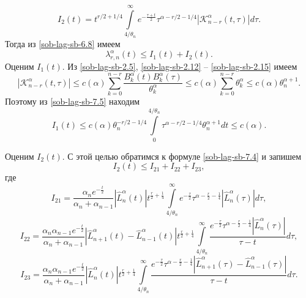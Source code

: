 \begin{equation}
  I_2(t) = t^{r/2+1/4}\int\limits_{4/\theta_n}^{\infty}
  e^{-\frac{\tau+t}{2}}\tau^{\alpha - r/2 - 1/4} \left| \mathcal{K}_{n-r}^\alpha(t, \tau) \right| d\tau.
\label{sob-lag-sb-7.6}
\end{equation}
Тогда из \eqref{sob-lag-sb-6.8} имеем
\begin{equation}
  \lambda_{r,n}^\alpha(t) \leq I_1(t) + I_2(t).
  \label{sob-lag-sb-7.7}
\end{equation}
Оценим $I_1(t)$. Из \eqref{sob-lag-sb-2.5}, \eqref{sob-lag-sb-2.12} -- \eqref{sob-lag-sb-2.15} имеем
\begin{equation*}
  |\mathcal{K}_{n-r}^\alpha(t,\tau)| \leq c(\alpha)\sum\limits_{k=0}^{n-r}\frac{B_k^\alpha(t) B_k^\alpha(\tau)}{\theta_k^\alpha} \leq c(\alpha)\sum\limits_{k=0}^{n-r}\theta_k^\alpha \leq c(\alpha)\theta_n^{\alpha+1}.
\end{equation*}
Поэтому из \eqref{sob-lag-sb-7.5} находим
\begin{equation}\label{sob-lag-sb-7.8}
I_1(t) \leq c(\alpha)\theta_n^{-r/2-1/4}\int\limits_{0}^{4/\theta_n} \tau^{\alpha-r/2-1/4}\theta_n^{\alpha+1}dt \leq  c(\alpha).
\end{equation}

  Оценим $I_2(t)$. С этой целью обратимся к формуле \eqref{sob-lag-sb-7.4} и запишем
\begin{equation}
  I_2(t) \le I_{21}+I_{22}+I_{23},
  \label{sob-lag-sb-7.9}
\end{equation}
где
\begin{equation*}
  I_{21} = \frac{\alpha_n e^{-\frac{t}{2}}}{\alpha_n + \alpha_{n-1}} |\hat{L}_n^\alpha(t)|t^{\frac{r}{2}+\frac{1}{4}}
  \int\limits_{4/\theta_n}^{\infty} e^{-\frac{\tau}{2}}\tau^{\alpha - \frac{r}{2} -\frac{1}{4}} |\hat{L}_n^\alpha(\tau)|d\tau,
\end{equation*}
\begin{equation*}
  I_{22} = \frac{\alpha_n\alpha_{n-1} e^{-\frac{t}{2}}}{\alpha_n+\alpha_{n-1}}|\hat{L}_{n+1}^\alpha(t) - \hat{L}_{n-1}^\alpha(t)|t^{\frac{r}{2}+\frac{1}{4}}
  \int\limits_{4/\theta_n}^{\infty} \frac{e^{-\frac{\tau}{2}}\tau^{\alpha - \frac{r}{2} -\frac{1}{4}} |\hat{L}_n^\alpha(\tau)|}{\tau - t}d\tau,
\end{equation*}
\begin{equation*}
  I_{23} = \frac{\alpha_n\alpha_{n-1} e^{-\frac{t}{2}}}{\alpha_n+\alpha_{n-1}}
  |\hat{L}_{n}^\alpha(t)|
  t^{\frac{r}{2}+\frac{1}{4}}
  \int\limits_{4/\theta_n}^{\infty} \frac{e^{-\frac{\tau}{2}}\tau^{\alpha - \frac{r}{2} -\frac{1}{4}} |\hat{L}_{n+1}^\alpha(\tau) - \hat{L}_{n-1}^\alpha(\tau)|}
  {\tau - t}d\tau.
\end{equation*}

